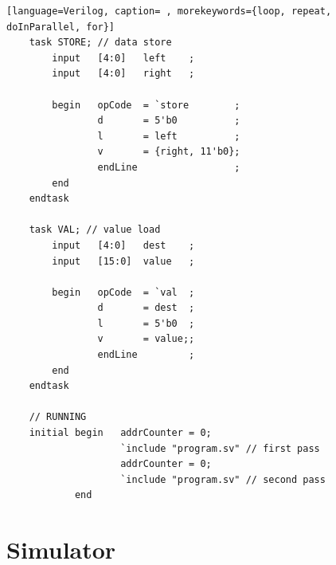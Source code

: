 {\begin{shaded*}
\begin{lstlisting}[language=Verilog, caption= , morekeywords={loop, repeat, doInParallel, for}]
    task STORE; // data store
        input   [4:0]   left    ;
        input   [4:0]   right   ;

        begin   opCode  = `store        ;
                d       = 5'b0          ;
                l       = left          ;
                v       = {right, 11'b0};
                endLine                 ;
        end
    endtask

    task VAL; // value load
        input   [4:0]   dest    ;
        input   [15:0]  value   ;

        begin   opCode  = `val  ;
                d       = dest  ;
                l       = 5'b0  ;
                v       = value;;
                endLine         ;
        end
    endtask

    // RUNNING
    initial begin   addrCounter = 0;
                    `include "program.sv" // first pass
                    addrCounter = 0;
                    `include "program.sv" // second pass
            end
\end{lstlisting}
\end{shaded*}
}

\section{Simulator}\label{riscsim}

